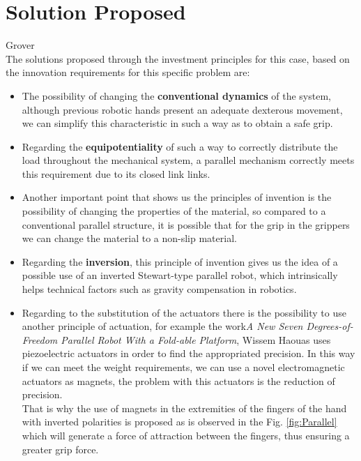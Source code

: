 \documentclass[12pt, twoside]{report}
\begin{document}
\section{Solution Proposed}
Grover \\
The solutions proposed through the investment principles for this case, based on the innovation requirements for this specific problem are:\\
\begin{itemize}
    \item The possibility of changing the \textbf{conventional dynamics} of the system, although previous robotic hands present an adequate dexterous movement, we can simplify this characteristic in such a way as to obtain a safe grip. 
    \item Regarding the \textbf{equipotentiality} of such a way to correctly distribute the load throughout the mechanical system, a parallel mechanism correctly meets this requirement due to its closed link links.
    \item Another important point that shows us the principles of invention is the possibility of changing the properties of the material, so compared to a conventional parallel structure, it is possible that for the grip in the grippers we can change the material to a non-slip material.
    \item Regarding the \textbf{inversion}, this principle of invention gives us the idea of a possible use of an inverted Stewart-type parallel robot, which intrinsically helps technical factors such as gravity compensation in robotics.
    \item Regarding to the substitution of the actuators there is the possibility to use another principle of actuation, for example the work\textit{A New Seven Degrees-of-Freedom Parallel Robot With a Fold-able Platform}, Wissem Haouas uses piezoelectric actuators in order to find the appropriated precision. In this way if we can meet the weight requirements, we can use a novel electromagnetic actuators as magnets, the problem with this actuators is the reduction of precision.\\
    That is why the use of magnets in the extremities of the fingers of the hand with inverted polarities is proposed as is observed in the Fig. \ref{fig:Parallel} which will generate a force of attraction between the fingers, thus ensuring a greater grip force.
    
\end{itemize}
\end{document}
